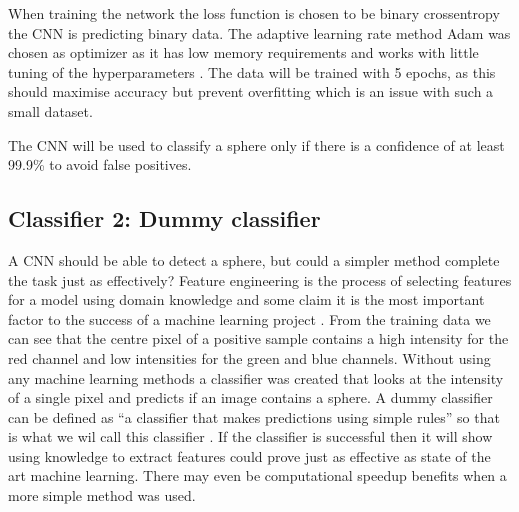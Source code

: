 \documentclass{article}
\begin{document}
When training the network the loss function is chosen to be binary crossentropy the CNN is predicting binary data.
The adaptive learning rate method Adam was chosen as optimizer as it has low memory requirements and works with little tuning of the hyperparameters \cite{Chengwei_2018}.
The data will be trained with 5 epochs, as this should maximise accuracy but prevent overfitting which is an issue with such a small dataset.

The CNN will be used to classify a sphere only if there is a confidence of at least 99.9\% to avoid false positives. 

\subsection{Classifier 2: Dummy classifier}
A CNN should be able to detect a sphere, but could a simpler method complete the task just as effectively?
Feature engineering is the process of selecting features for a model using domain knowledge and some claim it is the most important factor to the success of a machine learning project \cite{domingos2012few}.
From the training data we can see that the centre pixel of a positive sample contains a high intensity for the red channel and low intensities for the green and blue channels.
Without using any machine learning methods a classifier was created that looks at the intensity of a single pixel and predicts if an image contains a sphere. 
A dummy classifier can be defined as ``a classifier that makes predictions using simple rules'' so that is what we wil call this classifier \cite{dummyclassifier_2019}.
If the classifier is successful then it will show using knowledge to extract features could prove just as effective as state of the art machine learning.
There may even be computational speedup benefits when a more simple method was used.

\end{document}
